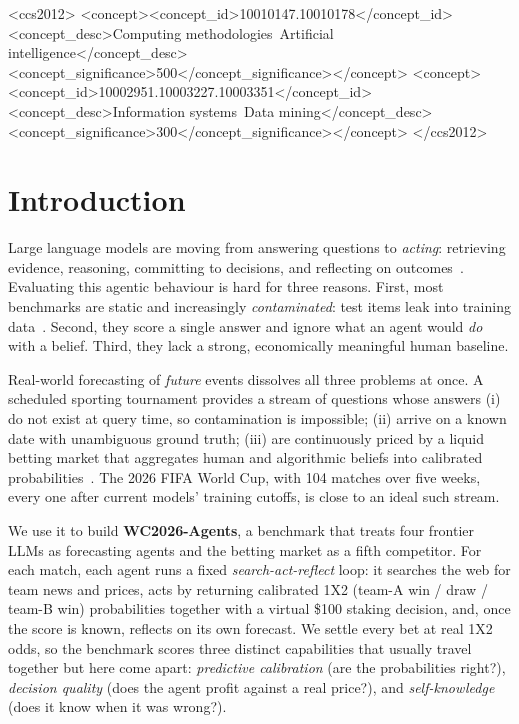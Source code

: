 \documentclass[sigconf,nonacm]{acmart}
\begin{document}
\begin{CCSXML}
<ccs2012>
<concept><concept_id>10010147.10010178</concept_id>
<concept_desc>Computing methodologies~Artificial intelligence</concept_desc>
<concept_significance>500</concept_significance></concept>
<concept><concept_id>10002951.10003227.10003351</concept_id>
<concept_desc>Information systems~Data mining</concept_desc>
<concept_significance>300</concept_significance></concept>
</ccs2012>
\end{CCSXML}


\maketitle

\section{Introduction}
Large language models are moving from answering questions to \emph{acting}:
retrieving evidence, reasoning, committing to decisions, and reflecting on
outcomes~\cite{yao2023react,park2023generative,xi2023agents}. Evaluating this
agentic behaviour is hard for three reasons. First, most benchmarks are static
and increasingly \emph{contaminated}: test items leak into training
data~\cite{golchin2024contamination,liang2023helm}. Second, they score a single
answer and ignore what an agent would \emph{do} with a belief. Third, they lack
a strong, economically meaningful human baseline.

Real-world forecasting of \emph{future} events dissolves all three problems at
once. A scheduled sporting tournament provides a stream of questions whose
answers (i) do not exist at query time, so contamination is impossible; (ii)
arrive on a known date with unambiguous ground truth; (iii) are continuously
priced by a liquid betting market that aggregates human and algorithmic beliefs
into calibrated probabilities~\cite{strumbelj2014odds,wolfers2004prediction}.
The 2026 FIFA World Cup, with 104 matches over five weeks, every one after current
models' training cutoffs, is close to an ideal such stream.

We use it to build \textbf{WC2026-Agents}, a benchmark that treats four frontier
LLMs as forecasting agents and the betting market as a fifth competitor. For
each match, each agent runs a fixed \emph{search-act-reflect} loop: it
searches the web for team news and prices, acts by returning calibrated
1X2 (team-A win / draw / team-B win) probabilities together with a virtual
\$100 staking decision, and, once the score is known, reflects on its own
forecast. We settle every
bet at real 1X2 odds, so the benchmark scores three distinct capabilities that
usually travel together but here come apart: \emph{predictive calibration}
(are the probabilities right?), \emph{decision quality} (does the agent profit
against a real price?), and \emph{self-knowledge} (does it know when it was
wrong?).
\end{document}
